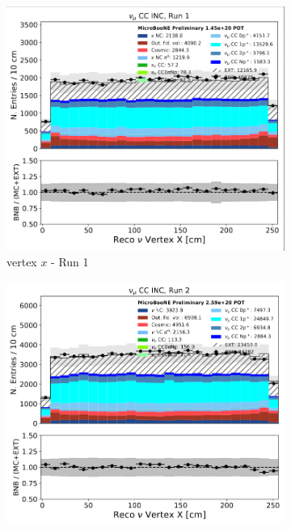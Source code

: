 \begin{figure}[hbt!] 
\begin{center}
    \begin{subfigure}[b]{0.3\textwidth}
    \centering
    \includegraphics[width=1.00\textwidth]{detsys/light/vtx_x_1.png}
    \caption{\label{fig:systematics:run1:nuvtxx}vertex $x$ - Run 1}
    \end{subfigure}
    \begin{subfigure}[b]{0.3\textwidth}
    \centering
    \includegraphics[width=1.00\textwidth]{detsys/light/vtx_x_2.png}

\end{subfigure}
\end{center}
\end{figure}
